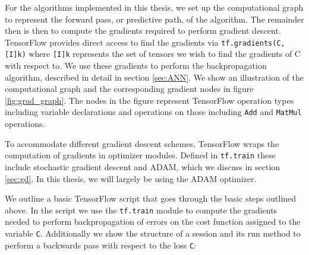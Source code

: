 For the algorithms implemented in this thesis, we set up the computational graph to represent the forward pass, or predictive path, of the algorithm. The remainder then is then to compute the gradients required to perform gradient descent. TensorFlow provides direct access to find the gradients via \lstinline{tf.gradients(C, [I]k)} where \lstinline{[I]k} represents the set of tensors we wish to find the gradients of C with respect to. We use these gradients to perform the backpropagation algorithm, described in detail in section \ref{sec:ANN}. We show an illustration of the computational graph and the corresponding gradient nodes in figure \ref{fig:grad_graph}. The nodes in the figure represent TensorFlow operation types including variable declarations and operations on those including \lstinline{Add} and \lstinline{MatMul} operations.

To accommodate different gradient descent schemes, TensorFlow wraps the computation of gradients in optimizer modules. Defined in \lstinline{tf.train} these include stochastic gradient descent and ADAM, which we discuss in section \ref{sec:gd}. In this thesis, we will largely be using the ADAM optimizer.

We outline a basic TensorFlow script that goes through the basic steps outlined above. In the script we use the \lstinline{tf.train} module to compute the gradients needed to perform backpropagation of errors on the cost function assigned to the variable \lstinline{C}. Additionally we show the structure of a session and its run method to perform a backwards pass with respect to the loss \lstinline{C}:

\begin{minipage}{\linewidth}

\end{minipage}